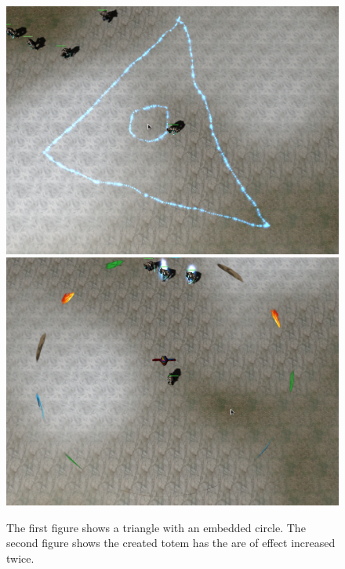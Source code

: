 \begin{figure}[p]
\centering
\includegraphics[width=.9\linewidth]{ext/scr/embcircle.png}
\quad
\includegraphics[width=.9\linewidth]{ext/scr/embcirclee.png}
\caption{The first figure shows a triangle with an embedded circle. The second figure shows the created totem has the are of effect increased twice. }
\label{fig:spell:embcircle}
\end{figure}

